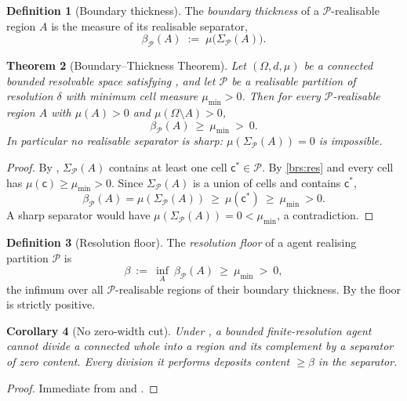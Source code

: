 \documentclass[11pt,a4paper]{article}
\theoremstyle{thmstyle}
\newtheorem{theorem}{Theorem}[section]
\newtheorem{corollary}[theorem]{Corollary}
\theoremstyle{definition}
\newtheorem{definition}[theorem]{Definition}
\theoremstyle{remark}
\newcommand{\Space}{\Omega}
\newcommand{\thick}{\beta}
\newcommand{\reso}{\delta}
\newcommand{\Part}{\mathscr{P}}
\newcommand{\cell}{\mathsf{c}}
\begin{document}
\begin{definition}[Boundary thickness]
\label{def:thickness}
The \emph{boundary thickness} of a $\Part$-realisable region $A$ is the measure
of its realisable separator,
\[
\thick_\Part(A)\;:=\;\mu\bigl(\Sigma_\Part(A)\bigr).
\]
\end{definition}

\begin{theorem}[Boundary--Thickness Theorem]
\label{thm:thickness}
Let $(\Space,d,\mu)$ be a connected bounded resolvable space satisfying
, and let $\Part$ be a realisable partition of resolution $\reso$
with minimum cell measure $\mu_{\min}>0$. Then for every $\Part$-realisable
region $A$ with $\mu(A)>0$ and $\mu(\Space\setminus A)>0$,
\[
\boxed{\ \thick_\Part(A)\ \ge\ \mu_{\min}\ >\ 0.\ }
\]
In particular no realisable separator is sharp: $\mu(\Sigma_\Part(A))=0$ is
impossible.
\end{theorem}

\begin{proof}
By , $\Sigma_\Part(A)$ contains at least one cell
$\cell^\ast\in\Part$. By \ref{brs:res} and  every cell
has $\mu(\cell)\ge\mu_{\min}>0$. Since $\Sigma_\Part(A)$ is a union of cells and
contains $\cell^\ast$,
\[
\thick_\Part(A)=\mu(\Sigma_\Part(A))\ \ge\ \mu(\cell^\ast)\ \ge\ \mu_{\min}\ >0 .
\]
A sharp separator would have $\mu(\Sigma_\Part(A))=0<\mu_{\min}$, a
contradiction.
\end{proof}

\begin{definition}[Resolution floor]
\label{def:floor}
The \emph{resolution floor} of a agent realising partition $\Part$ is
\[
\thick\ :=\ \inf_{A}\ \thick_\Part(A)\ \ge\ \mu_{\min}\ >\ 0,
\]
the infimum over all $\Part$-realisable regions of their boundary thickness. By
 the floor is strictly positive.
\end{definition}

\begin{corollary}[No zero-width cut]
\label{cor:no-zero-cut}
Under , a bounded finite-resolution agent cannot divide a
connected whole into a region and its complement by a separator of zero content.
Every division it performs deposits content $\ge\thick$ in the separator.
\end{corollary}

\begin{proof}
Immediate from  and .
\end{proof}
\end{document}
